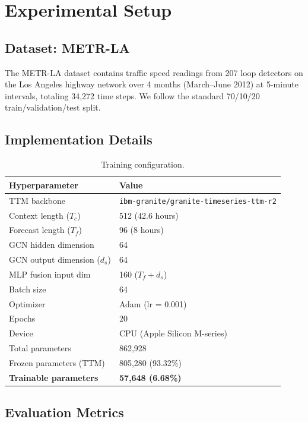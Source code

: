 \documentclass[11pt, a4paper]{article}
\begin{document}
\section{Experimental Setup}
\label{sec:experiments}

\subsection{Dataset: METR-LA}

The METR-LA dataset contains traffic speed readings from 207 loop detectors on the Los Angeles highway network over 4 months (March--June 2012) at 5-minute intervals, totaling 34,272 time steps. We follow the standard 70/10/20 train/validation/test split.

\subsection{Implementation Details}

\begin{table}[h]
\centering
\caption{Training configuration.}
\label{tab:config}
\begin{tabular}{ll}
\toprule
\textbf{Hyperparameter} & \textbf{Value} \\
\midrule
TTM backbone & \texttt{ibm-granite/granite-timeseries-ttm-r2} \\
Context length ($T_c$) & 512 (42.6 hours) \\
Forecast length ($T_f$) & 96 (8 hours) \\
GCN hidden dimension & 64 \\
GCN output dimension ($d_s$) & 64 \\
MLP fusion input dim & 160 ($T_f + d_s$) \\
Batch size & 64 \\
Optimizer & Adam (lr = 0.001) \\
Epochs & 20 \\
Device & CPU (Apple Silicon M-series) \\
\midrule
Total parameters & 862,928 \\
Frozen parameters (TTM) & 805,280 (93.32\%) \\
\textbf{Trainable parameters} & \textbf{57,648 (6.68\%)} \\
\bottomrule
\end{tabular}
\end{table}

\subsection{Evaluation Metrics}
\end{document}
